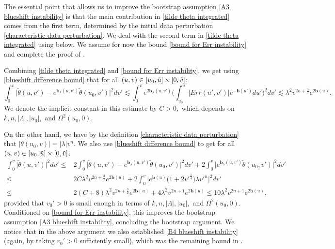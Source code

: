 \documentclass[11pt]{article}
\numberwithin{equation}{section}
\begin{document}
The essential point that allows us to improve the bootstrap assumption \eqref{A3 blueshift instability} is that the main contribution in \eqref{tilde theta integrated} comes from the first term, determined by the initial data perturbation \eqref{characteristic data perturbation}. We deal with the second term in \eqref{tilde theta integrated} using  below. We assume for now the bound \eqref{bound for Err instability} and complete the proof of .

Combining \eqref{tilde theta integrated} and \eqref{bound for Err instability}, we get using \eqref{blueshift difference bound} that for all $(u,v)\in[u_0,\Tilde{u}]\times[0,\Tilde{v}]$:
\[\int_0^v\Big|\widetilde{\theta}(u,v')-e^{\mathbf{b}_{\lambda}(u,v')}\widetilde{\theta}(u_0,v')\Big|^2dv'\lesssim\int_0^ve^{2\mathbf{b}_{\lambda}(u,v')}\bigg(\int_{u_0}^u\big|Err(u',v')\big|e^{-\mathbf{b}(u')}du'\bigg)^2dv'\lesssim\lambda^2v^{2n+\frac{3}{2}}e^{2\mathbf{b}(u)}.\]
We denote the implicit constant in this estimate by $C>0,$ which depends on $k,n,|\Lambda|,|u_0|,$ and $\Omega^2(u_0,0).$

On the other hand, we have by the definition \eqref{characteristic data perturbation} that $\big|\widetilde{\theta}(u_0,v)\big|=|\lambda|v^n$. We also use \eqref{blueshift difference bound} to get for all $(u,v)\in[u_0,\Tilde{u}]\times[0,\Tilde{v}]$:
\begin{align*}
    \int_0^v\big|\widetilde{\theta}(u,v')\big|^2dv'\leq&2\int_0^v\Big|\widetilde{\theta}(u,v')-e^{\mathbf{b}_{\lambda}(u,v')}\widetilde{\theta}(u_0,v')\Big|^2dv'+2\int_0^v\Big|e^{\mathbf{b}_{\lambda}(u,v')}\widetilde{\theta}(u_0,v')\Big|^2dv'\\
    \leq & 2C\lambda^2v^{2n+\frac{3}{2}}e^{2\mathbf{b}(u)}+2\int_0^v\Big|e^{\mathbf{b}(u)}\big(1+2v'^{\frac{1}{4}}\big)\lambda v'^n\Big|^2dv'\\
    \leq & 2(C+8)\lambda^2v^{2n+\frac{3}{2}}e^{2\mathbf{b}(u)}+4\lambda^2v^{2n+1}e^{2\mathbf{b}(u)}\leq10\lambda^2v^{2n+1}e^{2\mathbf{b}(u)},
\end{align*}
provided that $v_0'>0$ is small enough in terms of $k,n,|\Lambda|,|u_0|,$ and $\Omega^2(u_0,0).$ Conditioned on \eqref{bound for Err instability}, this improves the bootstrap assumption \eqref{A3 blueshift instability}, concluding the bootstrap argument. We notice that in the above argument we also established \eqref{B4 blueshift instability} (again, by taking $v_0'>0$ sufficiently small), which was the remaining bound in .
\end{document}
